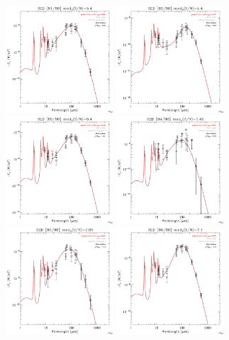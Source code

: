 \documentclass[preprint2,longabstract]{aastex}
\begin{document}
\begin{figure}
\centering
    \includegraphics[trim=0 2mm 0 0, clip, width=40mm]{SEDs/sed_81.pdf}
	\includegraphics[trim=0 2mm 0 0, clip, width=40mm]{SEDs/sed_82.pdf}
	\includegraphics[trim=0 2mm 0 0, clip, width=40mm]{SEDs/sed_83.pdf}
	\includegraphics[trim=0 2mm 0 0, clip, width=40mm]{SEDs/sed_84.pdf}
	\includegraphics[trim=0 2mm 0 0, clip, width=40mm]{SEDs/sed_85.pdf}
	\includegraphics[trim=0 2mm 0 0, clip, width=40mm]{SEDs/sed_86.pdf}

\end{figure}
\end{document}
